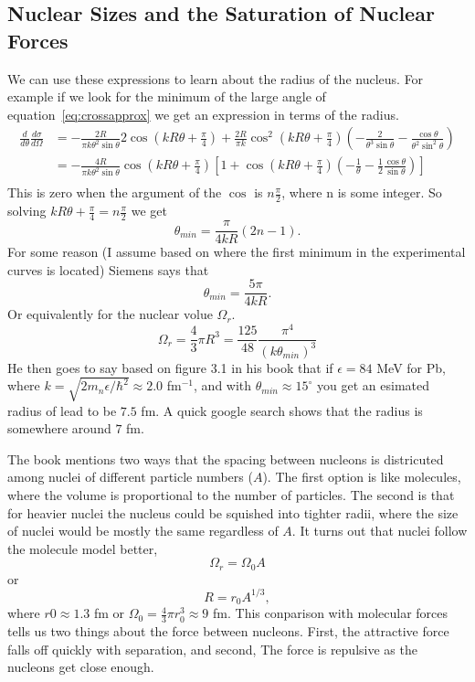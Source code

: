 \documentclass[12pt]{extarticle}
\begin{document}
\subsection*{Nuclear Sizes and the Saturation of Nuclear Forces}
We can use these expressions to learn about the radius of the nucleus. For example if we look for the minimum of the large angle of equation~\ref{eq:crossapprox} we get an expression in terms of the radius.
\begin{align}
   \frac{d}{d\theta}\frac{d\sigma}{d\Omega} &= -\frac{2R}{\pi k\theta^2\sin\theta}2\cos\left(kR\theta+\frac{\pi}{4}\right) + \frac{2R}{\pi k}\cos^2\left(kR\theta+\frac{\pi}{4}\right)\left(-\frac{2}{\theta^3\sin\theta}-\frac{\cos\theta}{\theta^2\sin^2\theta}\right) \\
   &= -\frac{4R}{\pi k\theta^2\sin\theta}\cos\left(kR\theta+\frac{\pi}{4}\right) \left[1 + \cos\left(kR\theta+\frac{\pi}{4}\right)\left(-\frac{1}{\theta}-\frac{1}{2}\frac{\cos\theta}{\sin\theta}\right)\right] \\
\end{align}
This is zero when the argument of the $\cos$ is $n\frac{\pi}{2}$, where n is some integer. So solving $kR\theta+\frac{\pi}{4} = n\frac{\pi}{2}$ we get
\begin{equation}
   \theta_{min} = \frac{\pi}{4kR}(2n-1).
\end{equation}
For some reason (I assume based on where the first minimum in the experimental curves is located) Siemens says that
\begin{equation}
   \boxed{ \theta_{min} = \frac{5\pi}{4kR} }.
\end{equation}
Or equivalently for the nuclear volue $\Omega_r$.
\begin{equation}
   \Omega_r = \frac{4}{3}\pi R^3 = \frac{125}{48}\frac{\pi^4}{(k\theta_{min})^3}
\end{equation}
He then goes to say based on figure 3.1 in his book that if $\epsilon = 84$ MeV for Pb, where $k = \sqrt{2m_n\epsilon/\hbar^2} \approx 2.0$ fm$^{-1}$, and with $\theta_{min} \approx 15^\circ$ you get an esimated radius of lead to be $7.5$ fm. A quick google search shows that the radius is somewhere around $7$ fm.

The book mentions two ways that the spacing between nucleons is districuted among nuclei of different particle numbers ($A$). The first option is like molecules, where the volume is proportional to the number of particles. The second is that for heavier nuclei the nucleus could be squished into tighter radii, where the size of nuclei would be mostly the same regardless of $A$. It turns out that nuclei follow the molecule model better,
\begin{equation}
   \Omega_r = \Omega_0 A
\end{equation}
or
\begin{equation}
   R = r_0 A^{1/3},
\end{equation}
where $r0 \approx 1.3$ fm or $\Omega_0 = \frac{4}{3} \pi r_0^3 \approx 9$ fm.
This conparison with molecular forces tells us two things about the force between nucleons. First, the attractive force falls off quickly with separation, and second, The force is repulsive as the nucleons get close enough.
\end{document}
